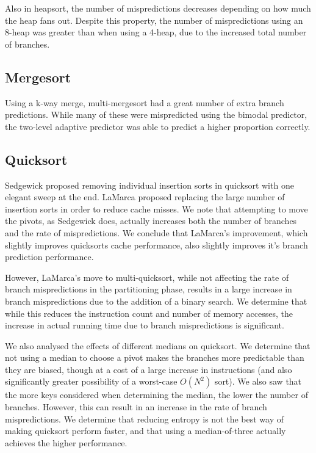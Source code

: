 Also in heapsort, the number of mispredictions decreases depending on how much
the heap fans out. Despite this property, the number of mispredictions using an
8-heap was greater than when using a 4-heap, due to the increased total number
of branches.


\subsection{Mergesort}

Using a k-way merge, multi-mergesort had a great number of extra branch
predictions. While many of these were mispredicted using the bimodal predictor,
the two-level adaptive predictor was able to predict a higher
proportion correctly.


\subsection{Quicksort}

Sedgewick proposed removing individual insertion sorts in quicksort with one
elegant sweep at the end. LaMarca proposed replacing the large number of
insertion sorts in order to reduce cache misses. We note that attempting to move
the pivots, as Sedgewick does, actually increases both the number of branches
and the rate of mispredictions. We conclude that LaMarca's improvement, which
slightly improves quicksorts cache performance, also slightly improves it's
branch prediction performance.

However, LaMarca's move to multi-quicksort, while not affecting the rate of
branch mispredictions in the partitioning phase, results in a large increase in
branch mispredictions due to the addition of a binary search. We determine that
while this reduces the instruction count and number of memory accesses, the
increase in actual running time due to branch mispredictions is significant.

We also analysed the effects of different medians on quicksort. We determine that
not using a median to choose a pivot makes the branches more predictable than
they are biased, though at a cost of a large increase in instructions (and also
significantly greater possibility of a worst-case $O(N^2)$ sort). We also saw
that the more keys considered when determining the median, the lower the number
of branches. However, this can result in an increase in the rate of branch
mispredictions. We determine that reducing entropy is not the best way of making
quicksort perform faster, and that using a median-of-three actually achieves the
higher performance.


